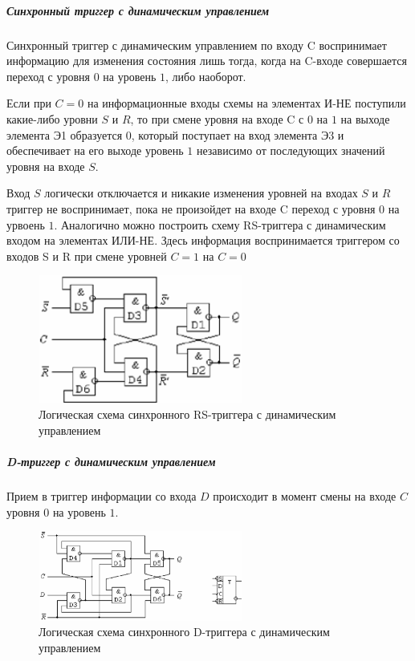 \documentclass{article}
\begin{document}
\begin{flushleft}
\subparagraph{Синхронный триггер с динамическим управлением}

Синхронный триггер с динамическим управлением по входу C воспринимает информацию для изменения состояния лишь тогда, когда на C-входе совершается переход с уровня $0$ на уровень $1$, либо наоборот.

Если при $C = 0$ на информационные входы схемы на элементах И-НЕ поступили какие-либо уровни $S$ и $R$, то при смене уровня на входе C с $0$ на $1$ на выходе элемента Э1 образуется $0$, который поступает на вход элемента Э3 и обеспечивает на его выходе уровень $1$ независимо от последующих значений уровня на входе $S$.

Вход $S$ логически отключается и никакие изменения уровней на входах $S$ и $R$ триггер не воспринимает, пока не произойдет на входе C переход с уровня $0$ на урвоень $1$. Аналогично можно построить схему RS-триггера с динамическим входом на элементах ИЛИ-НЕ. Здесь информация воспринимается триггером со входов S и R при смене уровней $C = 1$ на $C = 0$

\begin{figure}
\caption{Логическая схема синхронного RS-триггера с динамическим управлением}
\includegraphics[width=0.6\textwidth]{assets/synchronous_rs_trigger.png}
\end{figure}

\subparagraph{D-триггер с динамическим управлением}

Прием в триггер информации со входа $D$ происходит в момент смены на входе $C$ уровня $0$ на уровень $1$.

\begin{figure}
\caption{Логическая схема синхронного D-триггера с динамическим управлением}
\includegraphics[width=0.6\textwidth]{assets/synchronous_d_trigger.png}
\end{figure}


\end{flushleft}
\end{document}
